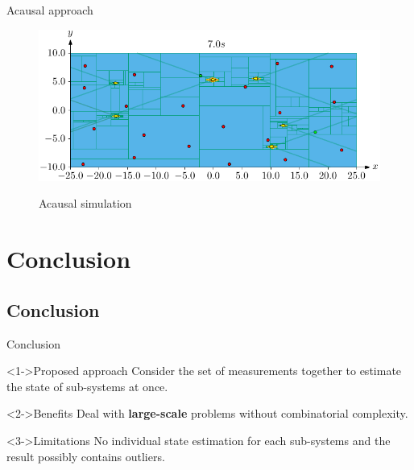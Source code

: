 \documentclass{beamer}
\begin{document}
            \begin{frame}{Acausal approach}
                \begin{figure}
                    \centering
                    \href{run:acausal.mp4?autostart}{\includegraphics[width=\textwidth]{imgs/acausal_cover}}
                    \caption{Acausal simulation}
                \end{figure}
            \end{frame}

    \section{Conclusion}

        \subsection{Conclusion}

            \begin{frame}{Conclusion}
                \centering
                \begin{minipage}{0.8\textwidth}
                    \begin{block}<1->{Proposed approach}
                        Consider the set of measurements together to estimate the state of sub-systems at once.
                    \end{block}
                    \begin{block}<2->{Benefits}
                        Deal with \textbf{large-scale} problems without combinatorial complexity.
                    \end{block}
                    \begin{block}<3->{Limitations}
                        No individual state estimation for each sub-systems and the result possibly contains outliers.
                    \end{block}
                \end{minipage}
            \end{frame}
\end{document}
